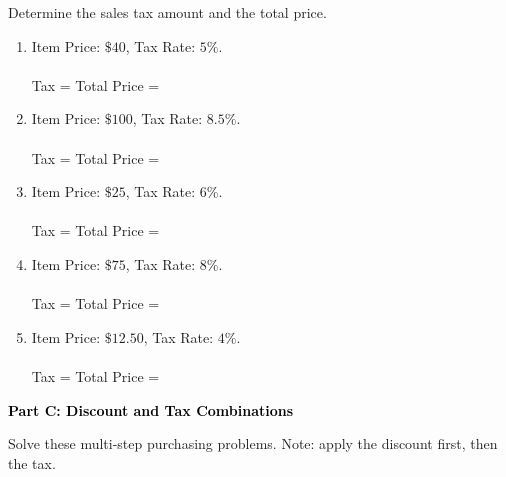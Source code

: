 \documentclass[12pt, letterpaper, fleqn]{article}
\newcommand{\blanklong}{\underline{\hspace{6.5cm}}}
\newcommand{\blankshorter}{\underline{\hspace{1.5cm}}}
\begin{document}
\vspace{3mm}

\noindent
Determine the sales tax amount and the total price.

\vspace{5mm}

\begin{enumerate}[itemsep=2.0cm, leftmargin=0.6cm]
\item Item Price: $\$40$, Tax Rate: $5\%$. \\ \\
Tax = \blankshorter \quad Total Price = \blanklong

\item Item Price: $\$100$, Tax Rate: $8.5\%$. \\ \\
Tax = \blankshorter \quad Total Price = \blanklong

\item Item Price: $\$25$, Tax Rate: $6\%$. \\ \\
Tax = \blankshorter \quad Total Price = \blanklong

\item Item Price: $\$75$, Tax Rate: $8\%$. \\ \\
Tax = \blankshorter \quad Total Price = \blanklong

\item Item Price: $\$12.50$, Tax Rate: $4\%$. \\ \\
Tax = \blankshorter \quad Total Price = \blanklong
\end{enumerate}

\newpage

\begin{tcolorbox}[colback=black!10]
    \large\textcolor{black}{\textbf{Part C: Discount and Tax Combinations}}
\end{tcolorbox}

\vspace{3mm}

\noindent
Solve these multi-step purchasing problems. Note: apply the discount first, then the tax.

\vspace{5mm}
\end{document}
